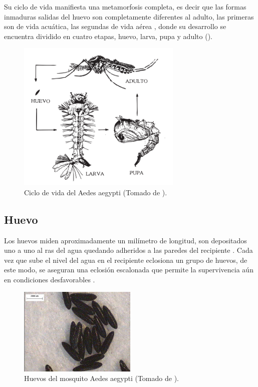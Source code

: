 Su ciclo de vida manifiesta una metamorfosis completa, es decir que las formas inmaduras salidas
del huevo son completamente diferentes al adulto, las primeras son de vida acuática, las segundas
de vida aérea \cite{directricesDetvArg}, donde su desarrollo se encuentra dividido en cuatro
etapas, huevo, larva, pupa y adulto \cite{web-site:gMonteroBiologia}
().

\begin{figure}[!htbp]
\centering
\includegraphics[width=0.7\textwidth]{capitulo-3/graphics/ciclo-de-vida.png}
\caption{\label{fig:cap3-ciclo-de-vida} Ciclo de vida del Aedes aegypti (Tomado de
\cite{directricesDetvArg}).}
\end{figure}

\subsection{Huevo}
\label{subsec:ciclo-biologico-huevo}
Los huevos miden aproximadamente un milímetro de longitud, son depositados uno a uno al ras del agua quedando adheridos a las paredes del recipiente \cite{ThironIzcazaJ2003}. Cada vez que sube el
nivel del agua en el recipiente eclosiona un grupo de huevos, de este modo, se aseguran una
eclosión escalonada que permite la supervivencia aún en condiciones desfavorables
\cite{directricesDetvArg}.

\begin{figure}[!htbp]
\centering
\includegraphics[width=0.5\textwidth]{capitulo-3/graphics/huevos.png}
\caption{\label{fig:cap3-huevos} Huevos del mosquito Aedes aegypti (Tomado de
\cite{sivanathan2006ecology}).}
\end{figure}

